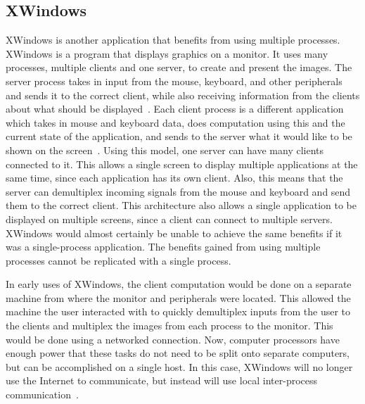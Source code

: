 \subsection{XWindows}
\label{sec:xwindows}
XWindows is another application that benefits from using multiple processes.  XWindows is a program that displays graphics on a monitor.  It uses many processes, multiple clients and one server, to create and present the images.  The server process takes in input from the mouse, keyboard, and other peripherals and sends it to the correct client, while also receiving information from the clients about what should be displayed~\cite{Scheifler:1986:XWS:22949.24053}.  Each client process is a different application which takes in mouse and keyboard data, does computation using this and the current state of the application, and sends to the server what it would like to be shown on the screen~\cite{Scheifler:1986:XWS:22949.24053}.  Using this model, one server can have many clients connected to it.  This allows a single screen to display multiple applications at the same time, since each application has its own client.  Also, this means that the server can demultiplex incoming signals from the mouse and keyboard and send them to the correct client.  This architecture also allows a single application to be displayed on multiple screens, since a client can connect to multiple servers.  XWindows would almost certainly be unable to achieve the same benefits if it was a single-process application.  The benefits gained from using multiple processes cannot be replicated with a single process.

In early uses of XWindows, the client computation would be done on a separate machine from where the monitor and peripherals were located.  This allowed the machine the user interacted with to quickly demultiplex inputs from the user to the clients and multiplex the images from each process to the monitor.  This would be done using a networked connection.  Now, computer processors have enough power that these tasks do not need to be split onto separate computers, but can be accomplished on a single host.  In this case, XWindows will no longer use the Internet to communicate, but instead will use local inter-process communication~\cite[p 373]{Stevens:1997:UNP:522800}.


